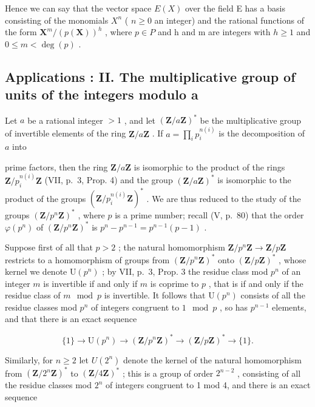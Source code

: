 Hence we can say that the vector space \(E(X)\) over the field E has a basis consisting of the monomials \(X^{n}\) ( \(n \geqslant 0\) an integer) and the rational functions of the form \(\mathbf{X}^{m}/(p(\mathbf{X}))^{h}\) , where \(p \in P\) and h and m are integers with \(h \geqslant 1\) and \(0 \leqslant m < \deg(p)\) .

\subsection{Applications : II. The multiplicative group of units of the integers modulo a}

Let \(a\) be a rational integer \(> 1\) , and let \((\mathbf{Z} / a\mathbf{Z})^*\) be the multiplicative group of invertible elements of the ring \(\mathbf{Z} / a\mathbf{Z}\) . If \(a = \prod_{i} p_i^{n(i)}\) is the decomposition of \(a\) into

prime factors, then the ring \(\mathbf{Z}/a\mathbf{Z}\) is isomorphic to the product of the rings \(\mathbf{Z}/p_{i}^{n(i)}\mathbf{Z}\) (VII, p.~3, Prop. 4) and the group \((\mathbf{Z}/a\mathbf{Z})^{*}\) is isomorphic to the product of the groups \((\mathbf{Z}/p_{i}^{n(i)}\mathbf{Z})^{*}\) . We are thus reduced to the study of the groups \((\mathbf{Z}/p^{n}\mathbf{Z})^{*}\) , where \(p\) is a prime number; recall (V, p.~80) that the order \(\varphi(p^{n})\) of \((\mathbf{Z}/p^{n}\mathbf{Z})^{*}\) is \(p^{n}-p^{n-1}=p^{n-1}(p-1)\) .

Suppose first of all that \(p > 2\) ; the natural homomorphism \(\mathbf{Z} / p^n\mathbf{Z} \to \mathbf{Z} / p\mathbf{Z}\) restricts to a homomorphism of groups from \((\mathbf{Z} / p^n\mathbf{Z})^*\) onto \((\mathbf{Z} / p\mathbf{Z})^*\) , whose kernel we denote \(\mathrm{U}(p^n)\) ; by VII, p.~3, Prop. 3 the residue class mod \(p^n\) of an integer \(m\) is invertible if and only if \(m\) is coprime to \(p\) , that is if and only if the residue class of \(m \mod p\) is invertible. It follows that \(\mathrm{U}(p^n)\) consists of all the residue classes mod \(p^n\) of integers congruent to \(1 \mod p\) , so has \(p^{n-1}\) elements, and that there is an exact sequence

\[
\{1 \} \rightarrow \mathrm{U} (p ^ {n}) \rightarrow (\mathbf {Z} / p ^ {n} \mathbf {Z}) ^ {*} \rightarrow (\mathbf {Z} / p \mathbf {Z}) ^ {*} \rightarrow \{1 \}.\tag{3}
\]

Similarly, for \(n \geqslant 2\) let \(U(2^n)\) denote the kernel of the natural homomorphism from \((\mathbf{Z}/2^n\mathbf{Z})^*\) to \((\mathbf{Z}/4\mathbf{Z})^*\) ; this is a group of order \(2^{n-2}\) , consisting of all the residue classes mod \(2^n\) of integers congruent to 1 mod 4, and there is an exact sequence

